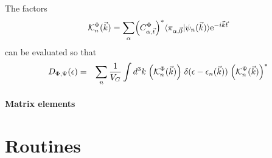 \documentclass[11pt,a4paper]{report}
\begin{document}
The factors
\begin{eqnarray}
\mathcal{K}^\Phi_{n}(\vec{k})=\sum_\alpha \Bigl(C^\Phi_{\alpha,\vec{t}}\Bigr)^*
\langle\pi_{\alpha,\vec{0}}|\psi_n(\vec{k})\rangle
\mathrm{e}^{-i\vec{k}\vec{t}}
\end{eqnarray}
can be evaluated so that
\begin{eqnarray}
D_{\Phi,\Psi}(\epsilon)
&=&
\sum_n\frac{1}{V_G}\int d^3k\; 
\Bigl(\mathcal{K}^\Phi_{n}(\vec{k})\Bigr)
\;\delta(\epsilon-\epsilon_n(\vec{k}))\;
\Bigl(\mathcal{K}^\Psi_{n}(\vec{k})\Bigr)^*
\nonumber\\
\end{eqnarray}




\subsubsection{Matrix elements}




\chapter{Routines}
\cite{bloechl94_prb50_17953}

\end{document}
